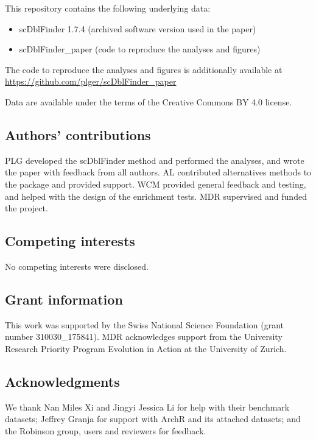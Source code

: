 \documentclass[10pt,a4paper,twocolumn]{article}
\begin{document}
This repository contains the following underlying data:

\begin{itemize}
\tightlist
\item
  scDblFinder 1.7.4 (archived software version used in the paper)
\item
  scDblFinder\_paper (code to reproduce the analyses and figures)
\end{itemize}

The code to reproduce the analyses and figures is additionally available at \url{https://github.com/plger/scDblFinder_paper}

Data are available under the terms of the Creative Commons BY 4.0 license.

\subsection*{Authors' contributions}

PLG developed the scDblFinder method and performed the analyses, and wrote the paper with feedback from all authors.
AL contributed alternatives methods to the package and provided support.
WCM provided general feedback and testing, and helped with the design of the enrichment tests.
MDR supervised and funded the project.

\subsection*{Competing interests}

No competing interests were disclosed.

\subsection*{Grant information}

This work was supported by the Swiss National Science Foundation (grant number 310030\_175841). MDR acknowledges support from the University Research Priority Program Evolution in Action at the University of Zurich.

\subsection*{Acknowledgments}

We thank Nan Miles Xi and Jingyi Jessica Li for help with their benchmark datasets; Jeffrey Granja for support with ArchR and its attached datasets; and the Robinson group, users and reviewers for feedback.
\end{document}
